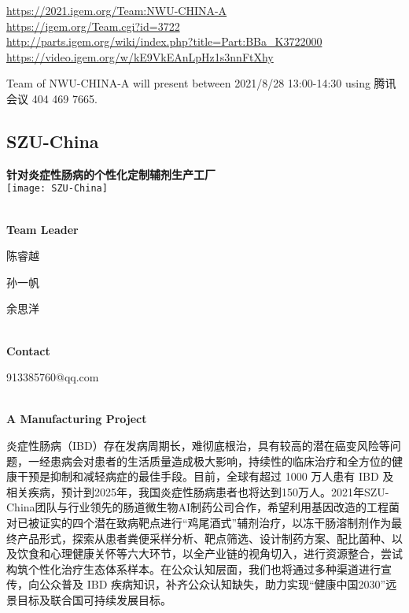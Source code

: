 \url{https://2021.igem.org/Team:NWU-CHINA-A }\\
\url{https://igem.org/Team.cgi?id=3722 }\\
\url{http://parts.igem.org/wiki/index.php?title=Part:BBa_K3722000 }\\
\url{https://video.igem.org/w/kE9VkEAnLpHz1s3nnFtXhy }\\

\vfill{}









Team of NWU-CHINA-A will present between      2021/8/28 13:00-14:30   using 腾讯会议 404 469 7665.
\newpage


\subsection{\textcolor{Blu}{ SZU-China } }
\vspace{5mm}
\begin{center}
\large{
  \textbf{ 针对炎症性肠病的个性化定制辅剂生产工厂 }\\

  \texttt{[image: SZU-China]}
}
\end{center}
\textbf{\\Team Leader}

  陈睿越

  孙一帆

  余思洋


\textbf{\\Contact}

  913385760@qq.com


\textbf{\\A Manufacturing Project\\}\begin{spacing}{1.5}

炎症性肠病（IBD）存在发病周期长，难彻底根治，具有较高的潜在癌变风险等问题，一经患病会对患者的生活质量造成极大影响，持续性的临床治疗和全方位的健康干预是抑制和减轻病症的最佳手段。目前，全球有超过 1000 万人患有 IBD 及相关疾病，预计到2025年，我国炎症性肠病患者也将达到150万人。2021年SZU-China团队与行业领先的肠道微生物AI制药公司合作，希望利用基因改造的工程菌对已被证实的四个潜在致病靶点进行“鸡尾酒式”辅剂治疗，以冻干肠溶制剂作为最终产品形式，探索从患者粪便采样分析、靶点筛选、设计制药方案、配比菌种、以及饮食和心理健康关怀等六大环节，以全产业链的视角切入，进行资源整合，尝试构筑个性化治疗生态体系样本。在公众认知层面，我们也将通过多种渠道进行宣传，向公众普及 IBD 疾病知识，补齐公众认知缺失，助力实现“健康中国2030”远景目标及联合国可持续发展目标。\end{spacing}
\\

